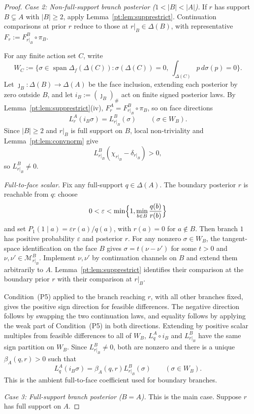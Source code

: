 \documentclass[11pt,a4paper]{article}
\theoremstyle{definition}
\newcommand{\1}{\mathbf 1}
\begin{document}
\begin{proof}
\emph{Case 2: Non-full-support branch posterior ($1<|B|<|A|$).}  If $r$ has support $B\subsetneq A$ with $|B|\ge 2$,
apply Lemma~\ref{pt:lem:supprestrict}.  Continuation comparisons at prior $r$ reduce to those at $r|_B\in\Delta(B)$,
with representative $F_r:=F_{r|_B}^B\circ\pi_B$.

For any finite action set $C$, write
\[
W_C:=\{\sigma\in\operatorname{span}\Delta_f(\Delta(C)):\sigma(\Delta(C))=0,\ \textstyle\int_{\Delta(C)}p\,d\sigma(p)=0\}.
\]
Let $\jmath_B:\Delta(B)\to\Delta(A)$ be the face inclusion, extending each posterior by zero outside $B$, and let
$i_B:=(\jmath_B)_\#$ act on finite signed posterior laws.  By Lemma~\ref{pt:lem:supprestrict}(iv),
$F_r^A=F_{r|_B}^B\circ\pi_B$, so on face directions
\[
L_r^A(i_B\sigma)=L_{r|_B}^B(\sigma)\qquad(\sigma\in W_B).
\]
Since $|B|\ge2$ and $r|_B$ is full support on $B$, local non-triviality and Lemma~\ref{pt:lem:convnorm} give
\[
L_{r|_B}^B(\chi_{r|_B}-\delta_{r|_B})>0,
\]
so $L_{r|_B}^B\ne0$.

\emph{Full-to-face scalar.}  Fix any full-support $q\in\Delta(A)$.  The boundary posterior $r$ is reachable from $q$:
choose
\[
0<\varepsilon<\min\Bigl\{1,\min_{b\in B}\frac{q(b)}{r(b)}\Bigr\}
\]
and set $P_1(1\mid a)=\varepsilon r(a)/q(a)$, with $r(a)=0$ for $a\notin B$.  Then branch $1$ has positive probability
$\varepsilon$ and posterior $r$.  For any nonzero $\sigma\in W_B$, the tangent-space identification on the face $B$ gives
$\sigma=t(\nu-\nu')$ for some $t>0$ and $\nu,\nu'\in\mathcal M_{r|_B}^B$.  Implement $\nu,\nu'$ by continuation channels
on $B$ and extend them arbitrarily to $A$.  Lemma~\ref{pt:lem:supprestrict} identifies their comparison at the boundary prior
$r$ with their comparison at $r|_B$.

Condition~\textup{(P5)} applied to the branch reaching $r$, with all other branches fixed, gives the positive sign direction
for feasible differences.  The negative direction follows by swapping the two continuation laws, and equality follows by
applying the weak part of Condition~\textup{(P5)} in both directions.  Extending by positive scalar multiples from feasible
differences to all of $W_B$, $L_q^A\circ i_B$ and $L_{r|_B}^B$ have the same sign partition on $W_B$.  Since
$L_{r|_B}^B\ne0$, both are nonzero and there is a unique $\beta_A(q,r)>0$ such that
\[
L_q^A(i_B\sigma)=\beta_A(q,r)L_{r|_B}^B(\sigma)\qquad(\sigma\in W_B).
\]
This is the ambient full-to-face coefficient used for boundary branches.

\emph{Case 3: Full-support branch posterior ($B=A$).}  This is the main case.  Suppose $r$ has full support on $A$.


\end{proof}
\end{document}
